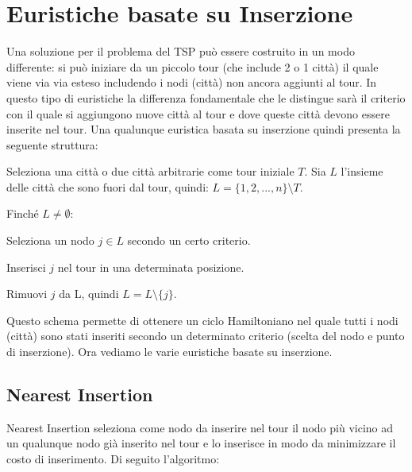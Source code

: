 \documentclass[a4paper,12pt]{report}
\begin{document}
\section{Euristiche basate su Inserzione}
Una soluzione per il problema del TSP può essere costruito in un modo differente: si può iniziare da un piccolo tour (che include 2 o 1 città) il quale viene via via esteso includendo i nodi (città) non ancora aggiunti al tour. In questo tipo di euristiche la differenza fondamentale che le distingue sarà il criterio con il quale si aggiungono nuove città al tour e dove queste città devono essere inserite nel tour. Una qualunque euristica basata su inserzione quindi presenta la seguente struttura:

\begin{legal}
  \item Seleziona una città o due città arbitrarie come tour iniziale $T$. Sia $L$ l'insieme delle città che sono fuori dal tour, quindi: $L = \{1, 2, ..., n\} \setminus T$.
  \item Finché $L \neq \emptyset$:
  \begin{legal}
    \item Seleziona un nodo $j \in L$ secondo un certo criterio.
    \item Inserisci $j$ nel tour in una determinata posizione.
    \item Rimuovi $j$ da L, quindi $L = L \setminus \{j\}$.
  \end{legal}
\end{legal}
\hfill \break
Questo schema permette di ottenere un ciclo Hamiltoniano nel quale tutti i nodi (città) sono stati inseriti secondo un determinato criterio (scelta del nodo e punto di inserzione). Ora vediamo le varie euristiche basate su inserzione.
\subsection{Nearest Insertion}
Nearest Insertion seleziona come nodo da inserire nel tour il nodo più vicino ad un qualunque nodo già inserito nel tour e lo inserisce in modo da minimizzare il costo di inserimento. Di seguito l'algoritmo:
\end{document}
